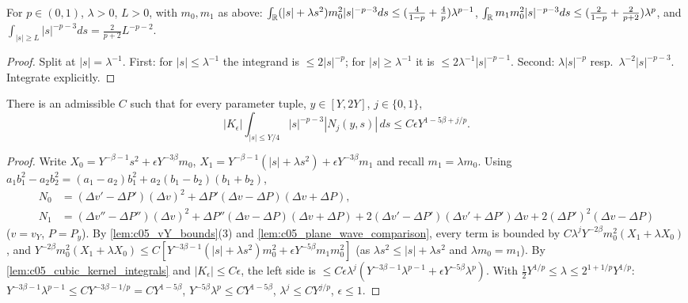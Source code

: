\begin{lemma}
  \label{lem:c05_cubic_kernel_integrals}
  For $p\in(0,1)$, $\lambda>0$, $L>0$, with $m_0,m_1$ as above:
  $\int_{\mathbb{R}}(|s|+\lambda s^2)m_0^2|s|^{-p-3}ds\le(\frac4{1-p}+\frac4p)\lambda^{p-1}$,
  $\int_{\mathbb{R}} m_1m_0^2|s|^{-p-3}ds\le(\frac2{1-p}+\frac2{p+2})\lambda^p$, and $\int_{|s|\ge L}|s|^{-p-3}ds=\frac{2}{p+2}L^{-p-2}$.
\end{lemma}
\begin{proof}
  Split at $|s|=\lambda^{-1}$. First: for $|s|\le\lambda^{-1}$ the integrand is $\le2|s|^{-p}$; for $|s|\ge\lambda^{-1}$ it is
  $\le2\lambda^{-1}|s|^{-p-1}$. Second: $\lambda|s|^{-p}$ resp.\ $\lambda^{-2}|s|^{-p-3}$. Integrate explicitly.
\end{proof}

\begin{lemma}
  \label{lem:c05_cubic_near}
  There is an admissible $C$ such that for every parameter tuple, $y\in[Y,2Y]$, $j\in\{0,1\}$,
  \begin{equation}\label{eqn:approx_cubic_near_bound}
    |K_\epsilon|\int_{|s|\le Y/4}|s|^{-p-3}|N_j(y,s)|\,ds\le C\epsilon Y^{1-5\beta+j/p}.
  \end{equation}
\end{lemma}
\begin{proof}
  Write $X_0=Y^{-\beta-1}s^2+\epsilon Y^{-3\beta}m_0$, $X_1=Y^{-\beta-1}(|s|+\lambda s^2)+\epsilon Y^{-3\beta}m_1$ and recall $m_1=\lambda m_0$.
  Using $a_1b_1^2-a_2b_2^2=(a_1-a_2)b_1^2+a_2(b_1-b_2)(b_1+b_2)$,
  \begin{align*}
    N_0&=(\Delta v'-\Delta P')(\Delta v)^2+\Delta P'(\Delta v-\Delta P)(\Delta v+\Delta P),\\
    N_1&=(\Delta v''-\Delta P'')(\Delta v)^2+\Delta P''(\Delta v-\Delta P)(\Delta v+\Delta P)
    +2(\Delta v'-\Delta P')(\Delta v'+\Delta P')\Delta v+2(\Delta P')^2(\Delta v-\Delta P)
  \end{align*}
  ($v=v_Y$, $P=P_y$). By \cref{lem:c05_vY_bounds}(3) and \cref{lem:c05_plane_wave_comparison}, every term is bounded by
  $C\lambda^jY^{-2\beta}m_0^2(X_1+\lambda X_0)$, and $Y^{-2\beta}m_0^2(X_1+\lambda X_0)\le C[Y^{-3\beta-1}(|s|+\lambda s^2)m_0^2+\epsilon Y^{-5\beta}m_1m_0^2]$
  (as $\lambda s^2\le|s|+\lambda s^2$ and $\lambda m_0=m_1$). By \cref{lem:c05_cubic_kernel_integrals} and $|K_\epsilon|\le C\epsilon$,
  the left side is $\le C\epsilon\lambda^j(Y^{-3\beta-1}\lambda^{p-1}+\epsilon Y^{-5\beta}\lambda^p)$. With $\frac12Y^{1/p}\le\lambda\le2^{1+1/p}Y^{1/p}$:
  $Y^{-3\beta-1}\lambda^{p-1}\le CY^{-3\beta-1/p}=CY^{1-5\beta}$, $Y^{-5\beta}\lambda^p\le CY^{1-5\beta}$, $\lambda^j\le CY^{j/p}$, $\epsilon\le1$.
\end{proof}

